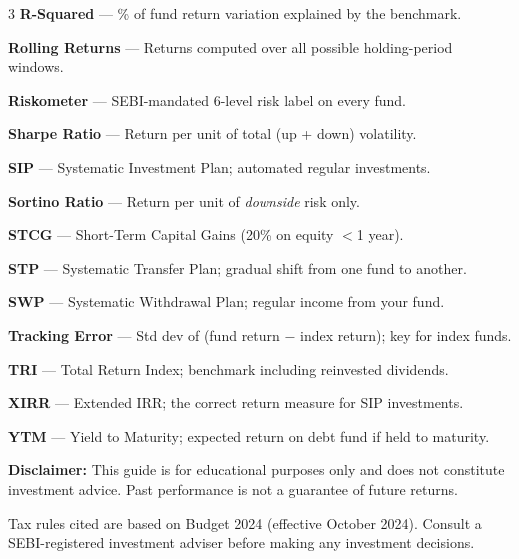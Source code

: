 \documentclass[11pt,a4paper]{article}
\begin{document}
\begin{multicols}{3}
\textbf{R-Squared} --- \% of fund return variation explained by the benchmark.

\textbf{Rolling Returns} --- Returns computed over all possible holding-period windows.

\textbf{Riskometer} --- SEBI-mandated 6-level risk label on every fund.

\textbf{Sharpe Ratio} --- Return per unit of total (up + down) volatility.

\textbf{SIP} --- Systematic Investment Plan; automated regular investments.

\textbf{Sortino Ratio} --- Return per unit of \emph{downside} risk only.

\textbf{STCG} --- Short-Term Capital Gains (20\% on equity $<$1 year).

\textbf{STP} --- Systematic Transfer Plan; gradual shift from one fund to another.

\textbf{SWP} --- Systematic Withdrawal Plan; regular income from your fund.

\textbf{Tracking Error} --- Std dev of (fund return $-$ index return); key for index funds.

\textbf{TRI} --- Total Return Index; benchmark including reinvested dividends.

\textbf{XIRR} --- Extended IRR; the correct return measure for SIP investments.

\textbf{YTM} --- Yield to Maturity; expected return on debt fund if held to maturity.

\end{multicols}

\vspace{5pt}
\begin{tcolorbox}[
  enhanced, colback=accent!28, colframe=accent!28,
  arc=4pt, boxrule=0pt, left=7pt, right=7pt, top=5pt, bottom=5pt
]
{\small\sffamily\textcolor{primary}{\textbf{Disclaimer:} This guide is for educational purposes only and does not constitute investment advice.  Past performance is not a guarantee of future returns.}\par
\textcolor{primary!70}{Tax rules cited are based on Budget 2024 (effective October 2024).  Consult a SEBI-registered investment adviser before making any investment decisions.}}
\end{tcolorbox}
\end{document}
